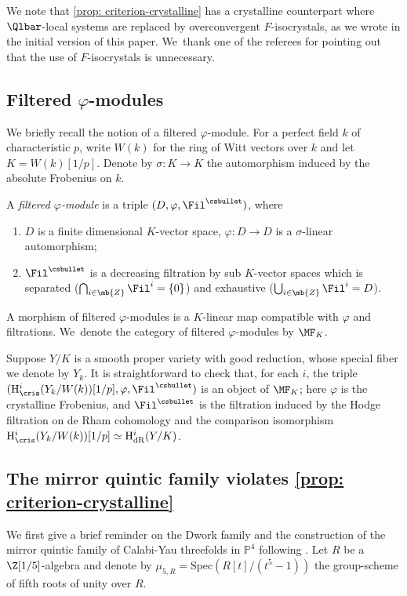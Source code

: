 \begin{rmk}
We note that \cref{prop: criterion-crystalline} has a crystalline counterpart where $\Qlbar$-local systems are replaced by overconvergent $F$-isocrystals, as we wrote in the initial version of this paper. We~thank one of the referees for pointing out that the use of $F$-isocrystals is unnecessary.
\end{rmk}

\subsection{Filtered \texorpdfstring{$\varphi$}{phi}-modules}
We briefly recall the notion of a filtered $\varphi$-module. For a perfect field $k$ of characteristic $p$, write $W(k)$ for the ring of Witt vectors over $k$ and let $K=W(k)[1/p]$. Denote by $\sigma: K\rightarrow K$ the automorphism induced by the absolute Frobenius on $k$.

\begin{defn}
A \emph{filtered $\varphi$-module} is a triple $(D, \varphi, \Fil^{\csbullet})$, where
\begin{enumerate}\renewcommand{\theenumi}{\roman{enumi}}
\item $D$ is a finite dimensional $K$-vector space, $\varphi: D\rightarrow D$ is a $\sigma$-linear automorphism;
\item $\Fil^{\csbullet}$ is a decreasing filtration by sub $K$-vector spaces which is separated (\ie $\bigcap_{i\in \mb{Z}} \Fil^i =\{0\}$) and exhaustive (\ie $\bigcup_{i\in \mb{Z}} \Fil^i=D$).
\end{enumerate}
A morphism of filtered $\varphi$-modules is a $K$-linear map compatible with $\varphi$ and filtrations. We~denote the category of filtered $\varphi$-modules by $\MF_K$.
\end{defn}

\begin{rmk}
Suppose $Y/K$ is a smooth proper variety with good reduction, whose special fiber we denote by $Y_k$. It is straightforward to check that, for each $i$, the triple $(\mathrm{H}^i_{\cris}(Y_k/W(k))[1/p], \varphi, \Fil^{\csbullet})$ is an object of $\MF_K$; here $\varphi$ is the crystalline Frobenius, and $\Fil^{\csbullet}$ is the filtration induced by the Hodge filtration on de Rham cohomology and the comparison isomorphism $\mathrm{H}^i_{\cris}(Y_k/W(k))[1/p]\simeq \mathrm{H}^i_{\mathrm{dR}}(Y/K)$.
\end{rmk}

\subsection{The mirror quintic family violates \texorpdfstring{\cref{prop: criterion-crystalline}}{the criterion}}
We first give a brief reminder on the Dwork family and the construction of the mirror quintic family of Calabi-Yau threefolds in $\mathbb{P}^4$ following \cite{Katz-Another-Look-at-the-Dwork-Family}. Let $R$ be a $\Z[1/5]$-algebra and denote by $\mu_{5,R}=\mathrm{Spec}(R[t]/(t^5-1))$ the group-scheme of fifth roots of unity over $R$.

